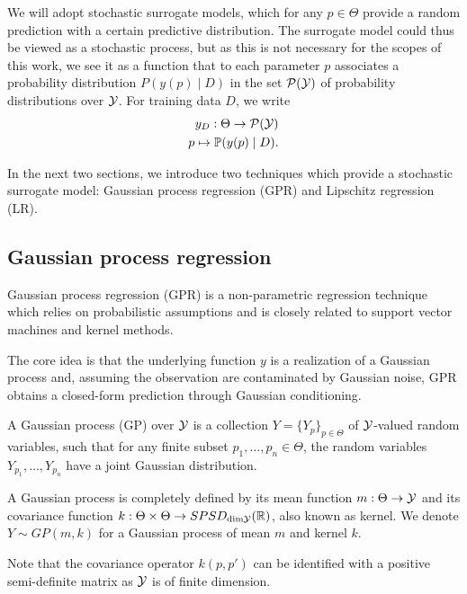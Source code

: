 We will adopt stochastic surrogate models, which for any $p \in \Theta$ provide a random prediction with a certain predictive distribution. 
The surrogate model could thus be viewed as a stochastic process, but as this is not necessary for the scopes of this work, we see it as a function that to each parameter $p$ associates a probability distribution $ P( y(p) \mid D)$ in the set $\mathcal P (\mathcal Y)$ of probability distributions over $\mathcal Y$.
For training data $D$, we write \begin{align*}
    y_D : \Theta \rightarrow \mathcal P( \mathcal Y) \\
    p \mapsto \mathbb P( y(p) \mid D).
\end{align*}

In the next two sections, we introduce two techniques which provide a stochastic surrogate model: Gaussian process regression (GPR) and Lipschitz regression (LR).

\subsection{Gaussian process regression}\label{sec:GPR}
Gaussian process regression (GPR) is a non-parametric regression technique which relies on probabilistic assumptions and is closely related to support vector machines and kernel methods.

The core idea is that the underlying function $y$ is a realization of a Gaussian process and, assuming the observation are contaminated by Gaussian noise, GPR obtains a closed-form prediction through Gaussian conditioning.\medbreak

\begin{dfn} 
    A Gaussian process (GP) over $\mathcal Y$ is a collection $Y = \{Y_p\}_{p\in\Theta}$ of $\mathcal Y$-valued random variables, such that for any finite subset $p_1, \ldots, p_n \in \Theta$, the random variables $Y_{p_1}, \ldots, Y_{p_n}$ have a joint Gaussian distribution.

    A Gaussian process is completely defined by its mean function $m: \Theta \rightarrow \mathcal Y$ and its covariance function $k: \Theta \times \Theta \rightarrow SPSD_{\text{dim}\mathcal Y}(\mathbb{R})$, also known as kernel. 
    We denote $Y \sim GP(m, k)$ for a Gaussian process of mean $m$ and kernel $k$.
\end{dfn}
Note that the covariance operator $k(p, p')$ can be identified with a positive semi-definite matrix as $\mathcal Y$ is of finite dimension. \medbreak

